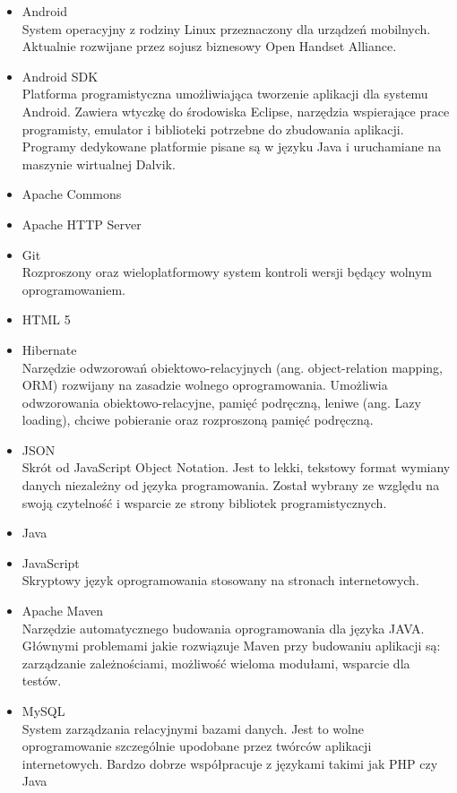 \documentclass[11pt,a4paper,polish,thesis]{dcsbook}
\begin{document}
\begin{itemize}
\item{Android} \\
System operacyjny z rodziny Linux przeznaczony dla urządzeń mobilnych. Aktualnie rozwijane przez sojusz biznesowy Open Handset Alliance.
\item{Android SDK} \\
Platforma programistyczna umożliwiająca tworzenie aplikacji dla systemu Android. Zawiera wtyczkę do środowiska Eclipse, narzędzia wspierające prace programisty, emulator i biblioteki potrzebne do zbudowania aplikacji. Programy dedykowane platformie pisane są w języku Java i uruchamiane na maszynie wirtualnej Dalvik.
\item{Apache Commons} \\
\item{Apache HTTP Server} \\
\item{Git} \\
Rozproszony oraz wieloplatformowy system kontroli wersji będący wolnym oprogramowaniem. 
\item{HTML 5} \\
\item{Hibernate} \\
Narzędzie odwzorowań obiektowo-relacyjnych (ang. object-relation mapping, ORM) rozwijany na zasadzie wolnego oprogramowania. Umożliwia odwzorowania obiektowo-relacyjne, pamięć podręczną, leniwe (ang. Lazy loading), chciwe pobieranie oraz rozproszoną pamięć podręczną.
\item{JSON} \\
Skrót od JavaScript Object Notation. Jest to lekki, tekstowy format wymiany danych niezależny od języka programowania. Został wybrany ze względu na swoją czytelność i wsparcie ze strony bibliotek programistycznych.
\item{Java} \\
\item{JavaScript} \\
Skryptowy język oprogramowania stosowany na stronach internetowych.
\item{Apache Maven} \\
Narzędzie automatycznego budowania oprogramowania dla języka JAVA. Głównymi problemami jakie rozwiązuje Maven przy budowaniu aplikacji są: zarządzanie zależnościami, możliwość wieloma modułami, wsparcie dla testów.
\item{MySQL} \\
System zarządzania relacyjnymi bazami danych. Jest to wolne oprogramowanie szczególnie upodobane przez twórców aplikacji internetowych. Bardzo dobrze współpracuje z językami takimi jak PHP czy Java

\end{itemize}
\end{document}

